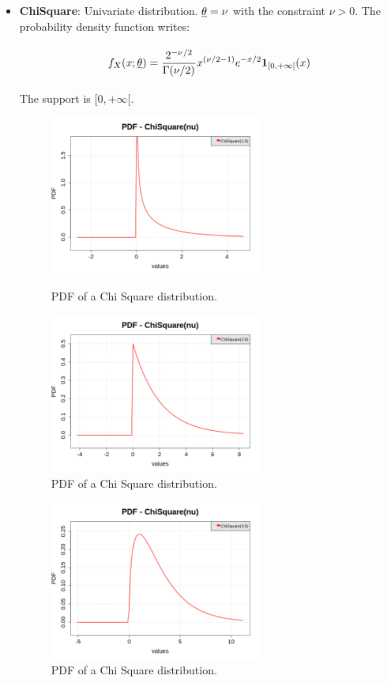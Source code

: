 {\begin{itemize}
\item {\bf ChiSquare}: Univariate distribution. ${\underline{\theta}} = \nu$ with the constraint $\nu >0$. The probability density function writes:
\begin{equation}
f_X(x;{\underline{\theta}}) = \displaystyle \frac{2^{-\nu^{\strut}/2}}{\Gamma(\nu/2)_{\strut}} x^{(\nu/2-1)}e^{-x/2}\boldsymbol{1}_{[0,+\infty[}(x)
\end{equation}
The support is $[0,+\infty[$.


\begin{figure}[H]
\begin{minipage}{8cm}
\begin{center}
\includegraphics[width=7cm]{Figures/pdf_ChiSquare_1.png}
\caption{PDF of a Chi Square distribution.}
\end{center}
\end{minipage}
\hfill
\begin{minipage}{8cm}
\begin{center}
\includegraphics[width=7cm]{Figures/pdf_ChiSquare_2.png}
\caption{PDF of a Chi Square distribution.}
\end{center}
\end{minipage}
\end{figure}

\begin{figure}[H]
\begin{center}
\includegraphics[width=7cm]{Figures/pdf_ChiSquare_3.png}
\caption{PDF of a Chi Square distribution.}
\end{center}
\end{figure}



\end{itemize}}

